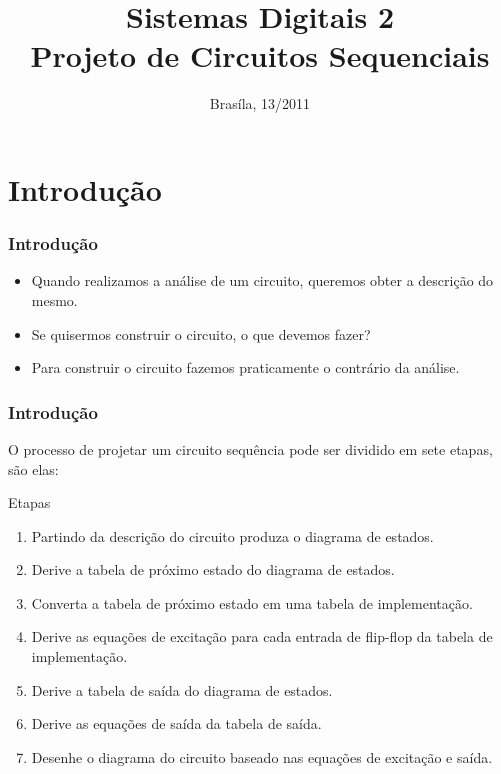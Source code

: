 \documentclass{beamer}
\title{Sistemas Digitais 2\\ \textbf{Projeto de Circuitos Sequenciais}}
\date{Brasíla, 13/2011}
\institute{\textbf{Universidade de Brasília - Faculdade do Gama}}
\begin{document}
\begin{frame}
  \titlepage
\end{frame}
  
\section{Introdução}
\begin{frame}
  \frametitle{Introdução}
  \begin{itemize}
   \item Quando realizamos a análise de um circuito, queremos obter a descrição do mesmo. \pause
   \item Se quisermos construir o circuito, o que devemos fazer? \pause
   \item Para construir o circuito fazemos praticamente o contrário da análise.
  \end{itemize}
\end{frame}

\begin{frame}
 \frametitle{Introdução}
 O processo de projetar um circuito sequência pode ser dividido em sete etapas, são elas:
 \begin{block}{Etapas}
  \begin{enumerate}
   \item Partindo da descrição do circuito produza o diagrama de estados.\pause
   \item Derive a tabela de próximo estado do diagrama de estados.\pause
   \item Converta a tabela de próximo estado em uma tabela de implementação.\pause
   \item Derive as equações de excitação para cada entrada de flip-flop da tabela de implementação.\pause
   \item Derive a tabela de saída do diagrama de estados.\pause
   \item Derive as equações de saída da tabela de saída. \pause
   \item Desenhe o diagrama do circuito baseado nas equações de excitação e saída.
  \end{enumerate}

 \end{block}

\end{frame}


\end{document}
